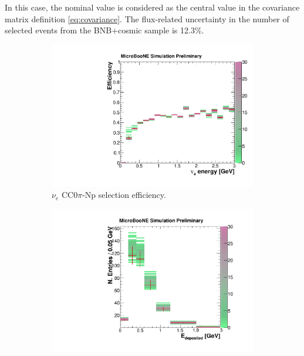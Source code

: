 In this case, the nominal value is considered as the central value in the covariance matrix definition \eqref{eq:covariance}.
The flux-related uncertainty in the number of selected events from the BNB+cosmic sample is 12.3\%.

\begin{figure}[htbp]
  \begin{center}
    \begin{subfigure}{0.48\textwidth}
      \includegraphics[width=\linewidth]{figures/eff_ene_flux.pdf}
      \caption{$\nu_{e}$ CC0$\pi$-Np selection efficiency.}  \label{fig:eff_flux}
    \end{subfigure}\hfill
    \begin{subfigure}{0.48\textwidth}
      \vspace{0.5em}
      \includegraphics[width=\linewidth]{figures/reco_flux.pdf}

\end{subfigure}
\end{center}
\end{figure}
